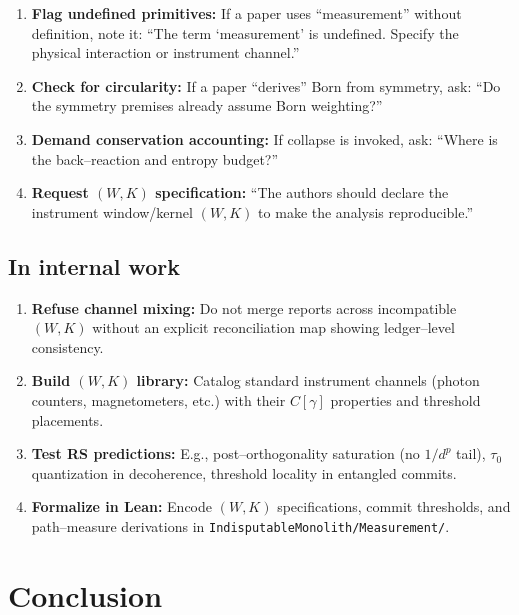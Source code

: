 \documentclass[11pt]{article}
\begin{document}
\begin{enumerate}[leftmargin=*]
  \item \textbf{Flag undefined primitives:} If a paper uses ``measurement'' without definition, note it: ``The term `measurement' is undefined. Specify the physical interaction or instrument channel.''
  
  \item \textbf{Check for circularity:} If a paper ``derives'' Born from symmetry, ask: ``Do the symmetry premises already assume Born weighting?''
  
  \item \textbf{Demand conservation accounting:} If collapse is invoked, ask: ``Where is the back--reaction and entropy budget?''
  
  \item \textbf{Request $(W,K)$ specification:} ``The authors should declare the instrument window/kernel $(W,K)$ to make the analysis reproducible.''
\end{enumerate}

\subsection{In internal work}

\begin{enumerate}[leftmargin=*]
  \item \textbf{Refuse channel mixing:} Do not merge reports across incompatible $(W,K)$ without an explicit reconciliation map showing ledger--level consistency.
  
  \item \textbf{Build $(W,K)$ library:} Catalog standard instrument channels (photon counters, magnetometers, etc.) with their $C[\gamma]$ properties and threshold placements.
  
  \item \textbf{Test RS predictions:} E.g., post--orthogonality saturation (no $1/d^p$ tail), $\tau_0$ quantization in decoherence, threshold locality in entangled commits.
  
  \item \textbf{Formalize in Lean:} Encode $(W,K)$ specifications, commit thresholds, and path--measure derivations in \texttt{IndisputableMonolith/Measurement/}.
\end{enumerate}

\section{Conclusion}
\end{document}
